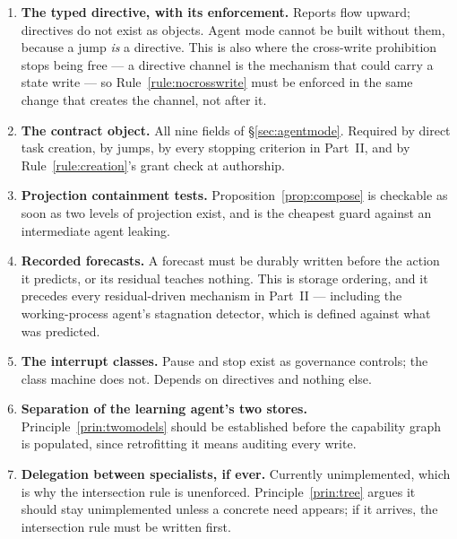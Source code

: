 \documentclass[11pt]{article}
\begin{document}
\begin{enumerate}[leftmargin=1.9em,itemsep=5pt]
\item \textbf{The typed directive, with its enforcement.} Reports flow upward; directives do not exist as objects. Agent mode cannot be built without them, because a jump \emph{is} a directive. This is also where the cross-write prohibition stops being free --- a directive channel is the mechanism that could carry a state write --- so Rule~\ref{rule:nocrosswrite} must be enforced in the same change that creates the channel, not after it.

\item \textbf{The contract object.} All nine fields of \S\ref{sec:agentmode}. Required by direct task creation, by jumps, by every stopping criterion in Part~II, and by Rule~\ref{rule:creation}'s grant check at authorship.

\item \textbf{Projection containment tests.} Proposition~\ref{prop:compose} is checkable as soon as two levels of projection exist, and is the cheapest guard against an intermediate agent leaking.

\item \textbf{Recorded forecasts.} A forecast must be durably written before the action it predicts, or its residual teaches nothing. This is storage ordering, and it precedes every residual-driven mechanism in Part~II --- including the working-process agent's stagnation detector, which is defined against what was predicted.

\item \textbf{The interrupt classes.} Pause and stop exist as governance controls; the class machine does not. Depends on directives and nothing else.

\item \textbf{Separation of the learning agent's two stores.} Principle~\ref{prin:twomodels} should be established before the capability graph is populated, since retrofitting it means auditing every write.

\item \textbf{Delegation between specialists, if ever.} Currently unimplemented, which is why the intersection rule is unenforced. Principle~\ref{prin:tree} argues it should stay unimplemented unless a concrete need appears; if it arrives, the intersection rule must be written first.
\end{enumerate}

\end{document}
